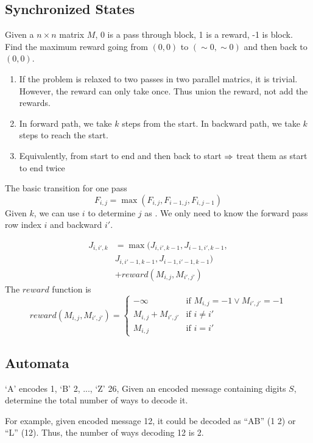 \subsection{Synchronized States}
 Given a $n \times n$ matrix $M$, 0 is a pass through block, 1 is a reward, -1 is block. Find the maximum reward going from $(0, 0)$ to $(\sim 0, \sim 0)$ and then back to $(0, 0)$. 

\begin{enumerate}
\item If the problem is relaxed to two passes in two parallel matrics, it is trivial. However, the reward can only take once. Thus union the reward, not add the rewards. 
\item In forward path, we take $k$ steps from the start. In backward path, we take $k$ steps to reach the start. 
\item Equivalently, from start to end and then back to start $\Rightarrow$ treat them as start to end twice
\end{enumerate}
The basic transition for one pass
$$
F_{i,j} = \max(F_{i, j}, F_{i-1, j}, F_{i, j-1})
$$
Given $k$, we can use $i$ to determine $j$ as . We only need to know the forward pass row index $i$ and backward $i'$. 

\begin{align*}
J_{i, i', k} &= \max(J_{i, i', k-1}, J_{i-1, i', k-1}, \\
& J_{i, i'-1, k-1}, J_{i-1, i'-1, k-1}) \\ 
& + reward(M_{i, j}, M_{i', j'})
\end{align*}
The $reward$ function is 
\[
reward(M_{i,j}, M_{i', j'}) = 
\begin{cases}
-\infty &\text{if } M_{i, j} = -1 \lor M_{i', j'} = -1 \\ 
M_{i, j} + M_{i', j'} &\text{if } i \neq i' \\ 
M_{i, j} &\text{if } i = i'
\end{cases}
\]
\subsection{Automata}
 `A' encodes 1, `B' 2, ..., `Z' 26, Given an encoded message containing digits $S$, determine the total number of ways to decode it.

For example, given encoded message 12, it could be decoded as ``AB'' (1 2) or ``L'' (12). Thus, the number of ways decoding 12 is 2.

